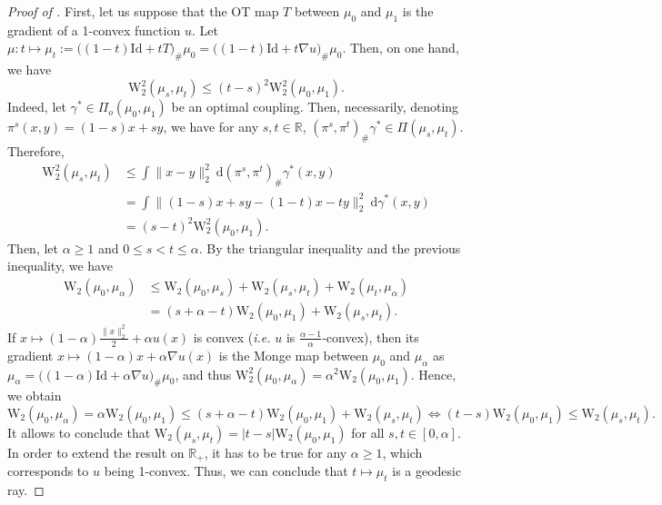 \documentclass[twoside]{article}
\newcommand{\W}{\mathrm{W}}
\newcommand{\id}{\mathrm{Id}}
\begin{document}
\begin{proof}[Proof of ]
    First, let us suppose that the OT map $T$ between $\mu_0$ and $\mu_1$ is the gradient of a 1-convex function $u$. Let $\mu:t\mapsto \mu_t:=\big((1-t)\id + tT)_\#\mu_0 = \big((1-t)\id + t\nabla u\big)_\#\mu_0$. Then, on one hand, we have
    \begin{equation}
        \W_2^2(\mu_s,\mu_t) \le (t-s)^2\W_2^2(\mu_0,\mu_1).
    \end{equation}
    Indeed, let $\gamma^*\in\Pi_o(\mu_0,\mu_1)$ be an optimal coupling. Then, necessarily, denoting $\pi^s(x,y) = (1-s) x + s y$, we have for any $s,t\in\mathbb{R}$, $(\pi^s,\pi^t)_\#\gamma^* \in \Pi(\mu_s,\mu_t)$. Therefore,
    \begin{equation}
        \begin{aligned}
            \W_2^2(\mu_s,\mu_t) &\le \int \|x-y\|_2^2\ \mathrm{d}(\pi^s,\pi^t)_\#\gamma^*(x,y) \\
            &= \int \|(1-s)x+sy - (1-t)x-ty\|_2^2\ \mathrm{d}\gamma^*(x,y) \\
            &= (s-t)^2 \W_2^2(\mu_0,\mu_1).
        \end{aligned}
    \end{equation}
    Then, let $\alpha\ge 1$ and $0\le s<t\le \alpha$. By the triangular inequality and the previous inequality, we have
    \begin{equation}
        \begin{aligned}
            \W_2(\mu_0, \mu_\alpha) &\le \W_2(\mu_0, \mu_s) + \W_2(\mu_s,\mu_t) + \W_2(\mu_t, \mu_\alpha) \\
            &= (s+\alpha-t)\W_2(\mu_0,\mu_1) + \W_2(\mu_s,\mu_t).
        \end{aligned}
    \end{equation}
    If $x\mapsto (1-\alpha)\frac{\|x\|_2^2}{2} + \alpha u(x)$ is convex (\emph{i.e.} $u$ is $\frac{\alpha-1}{\alpha}$-convex), then its gradient $x\mapsto (1-\alpha) x + \alpha\nabla u(x)$ is the Monge map between $\mu_0$ and $\mu_\alpha$ as $\mu_\alpha = \big((1-\alpha)\id + \alpha \nabla u\big)_\#\mu_0$, and thus $\W_2^2(\mu_0, \mu_\alpha) = \alpha^2 \W_2(\mu_0, \mu_1)$. Hence, we obtain
    \begin{equation}
        \W_2(\mu_0, \mu_\alpha) = \alpha \W_2(\mu_0,\mu_1) \le (s+\alpha-t)\W_2(\mu_0,\mu_1) + \W_2(\mu_s,\mu_t) \iff (t-s)\W_2(\mu_0,\mu_1) \le \W_2(\mu_s,\mu_t).
    \end{equation}
    It allows to conclude that $\W_2(\mu_s,\mu_t) = |t-s|\W_2(\mu_0,\mu_1)$ for all $s,t\in [0,\alpha ]$.
    In order to extend the result on $\mathbb{R}_+$, it has to be true for any $\alpha \ge 1$, which corresponds to $u$ being 1-convex. Thus, we can conclude that $t\mapsto \mu_t$ is a geodesic ray.


\end{proof}
\end{document}
